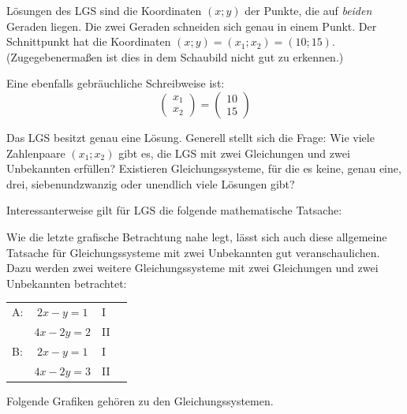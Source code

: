 \begin{center}
\end{center}

Lösungen des LGS sind die Koordinaten $(x;y)$ der Punkte, die auf \emph{beiden} Geraden liegen. Die zwei Geraden schneiden sich genau in einem Punkt. Der Schnittpunkt hat die Koordinaten $(x;y) = (x_1;x_2) = (10;15)$. (Zugegebenermaßen ist dies in dem Schaubild nicht gut zu erkennen.)

Eine ebenfalls gebräuchliche Schreibweise ist:
\[ \begin{pmatrix} x_1 \\ x_2 \end{pmatrix} = \begin{pmatrix} 10 \\ 15 \end{pmatrix} \]

Das LGS besitzt genau eine Lösung. Generell stellt sich die Frage: Wie viele Zahlenpaare $(x_1;x_2)$ gibt es, die LGS mit zwei Gleichungen und zwei Unbekannten erfüllen? Existieren Gleichungssysteme, für die es keine, genau eine, drei, siebenundzwanzig oder unendlich viele Lösungen gibt?

Interessanterweise gilt für LGS die folgende mathematische Tatsache:

Wie die letzte grafische Betrachtung nahe legt, lässt sich auch diese allgemeine Tatsache für Gleichungssysteme mit zwei Unbekannten gut veranschaulichen. Dazu werden zwei weitere Gleichungssysteme mit zwei Gleichungen und zwei Unbekannten betrachtet:
\begin{center}
  \begin{tabular}{lcll}
    A: & $2x - y = 1$ & I & \\
       & $4x - 2y = 2$ & II & \\[6pt]
    B: & $2x - y = 1$ & I & \\
       & $4x - 2y = 3$ & II &
  \end{tabular}
\end{center}
Folgende Grafiken gehören zu den Gleichungssystemen.

